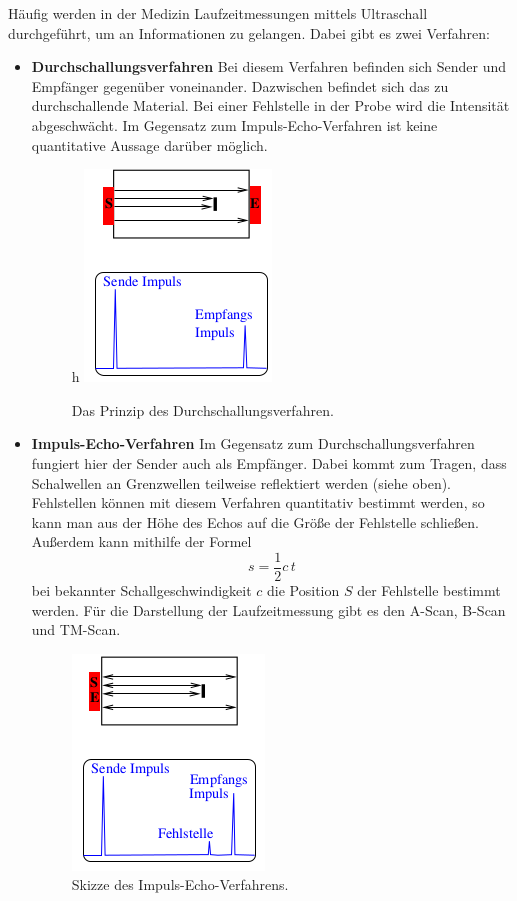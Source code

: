 Häufig werden in der Medizin Laufzeitmessungen mittels Ultraschall durchgeführt,
um an Informationen zu gelangen. Dabei gibt es zwei Verfahren:
\begin{itemize}
  \item \textbf{Durchschallungsverfahren}
  Bei diesem Verfahren befinden sich Sender und Empfänger gegenüber voneinander.
  Dazwischen befindet sich das zu durchschallende Material. Bei einer Fehlstelle
  in der Probe wird die Intensität abgeschwächt. Im Gegensatz zum Impuls-Echo-Verfahren
  ist keine quantitative Aussage darüber möglich.
  \begin{figure}{h}
    \centering
    \includegraphics[scale=0.5]{durchschall.png}
    \caption{Das Prinzip des Durchschallungsverfahren.}
    \label{fig:1}
  \end{figure}

  \item \textbf{Impuls-Echo-Verfahren}
  Im Gegensatz zum Durchschallungsverfahren fungiert hier der Sender auch als Empfänger.
  Dabei kommt zum Tragen, dass Schalwellen an Grenzwellen teilweise reflektiert werden (siehe oben).
  Fehlstellen können mit diesem Verfahren quantitativ bestimmt werden, so kann man aus der
  Höhe des Echos auf die Größe der Fehlstelle schließen. Außerdem kann mithilfe der Formel
  \begin{equation}
    s = \frac{1}{2} c \, t
    \label{eqn:6}
  \end{equation}
  bei bekannter Schallgeschwindigkeit $c$ die Position $S$ der Fehlstelle bestimmt werden.
  Für die Darstellung der Laufzeitmessung gibt es den A-Scan, B-Scan und TM-Scan.
  \begin{figure}
    \centering
    \includegraphics[scale=0.5]{impuls.png}
    \caption{Skizze des Impuls-Echo-Verfahrens.}
    \label{fig:2}
  \end{figure}
\end{itemize}
